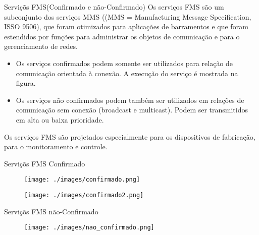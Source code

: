 \documentclass{beamer}
\begin{document}
\begin{frame}{Serviçõs FMS(Confirmado e não-Confirmado)}
Os serviços FMS são um subconjunto dos serviços MMS ((MMS = Manufacturing Message Specification, ISSO 9506), que foram otimizados para aplicações de barramentos e que foram estendidos por funções para administrar os objetos de comunicação e para o gerenciamento de redes. 
\begin{itemize}
\item Os serviços confirmados podem somente ser utilizados para relação de comunicação orientada à conexão. A execução do serviço é mostrada na figura.

\item Os serviços não confirmados podem também ser utilizados em relações de comunicação sem conexão (broadcast e multicast). Podem ser transmitidos em alta ou baixa prioridade.  
\end{itemize}

Os serviços FMS são projetados especialmente para os dispositivos de fabricação, para o monitoramento e controle.

\end{frame}

\begin{frame}{Serviçõs FMS Confirmado}
\begin{figure}
	\texttt{[image: ./images/confirmado.png]}
	\caption*{}
\end{figure}
\begin{figure}
	\texttt{[image: ./images/confirmado2.png]}
	\caption*{}
\end{figure}
\end{frame}

\begin{frame}{Serviçõs FMS não-Confirmado}
\begin{figure}
	\texttt{[image: ./images/nao\_confirmado.png]}
	\caption*{}
\end{figure}
\end{frame}
\end{document}
